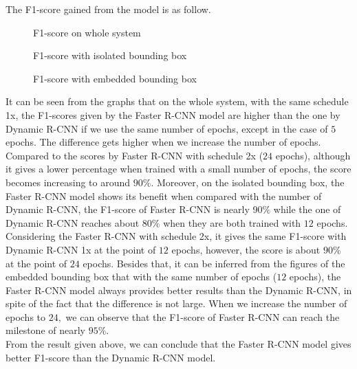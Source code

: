 The F1-score gained from the model is as follow.
\begin{figure}[H]
\caption{F1-score on whole system}
\end{figure}

\begin{figure}[H]
\caption{F1-score with isolated bounding box}
\end{figure}

\begin{figure}[H]
\caption{F1-score with embedded bounding box}
\end{figure}
It can be seen from the graphs that on the whole system, with the same schedule 1x, the F1-scores given by the Faster R-CNN model are higher than the one by Dynamic R-CNN if we use the same number of epochs, except in the case of $5$ epochs. The difference gets higher when we increase the number of epochs. Compared to the scores by Faster R-CNN with schedule 2x ($24$ epochs), although it gives a lower percentage when trained with a small number of epochs, the score becomes increasing to around $90\%$. Moreover, on the isolated bounding box, the Faster R-CNN model shows its benefit when compared with the number of Dynamic R-CNN, the F1-score of Faster R-CNN is nearly 90$\%$ while the one of Dynamic R-CNN reaches about 80$\%$ when they are both trained with $12$ epochs. Considering the Faster R-CNN with schedule 2x, it gives the same F1-score with Dynamic R-CNN 1x at the point of $12$ epochs, however,  the score is about $90\%$ at the point of $24$ epochs.  Besides that, it can be inferred from the figures of the embedded bounding box that with the same number of epochs ($12$ epochs), the Faster R-CNN model always provides better results than the Dynamic R-CNN, in spite of the fact that the difference is not large. When we increase the number of epochs to $24,$ we can observe that the F1-score of Faster R-CNN can reach the milestone of nearly $95\%.$\\
From the result given above, we can conclude that the Faster R-CNN model gives better F1-score than the Dynamic R-CNN model.

